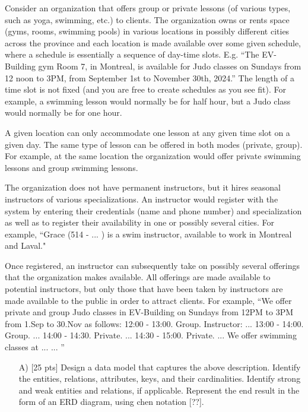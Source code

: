 \documentclass[12pt]{article}
\begin{document}
\begin{spacing}{1.5}
\begin{enumerate}
                  Consider an organization that offers group or private lessons (of various types, such as yoga, swimming, etc.) to clients. The organization owns or rents space (gyms, rooms, swimming pools) in various locations in possibly different cities across the province and each location is made available over some given schedule, where a schedule is essentially a sequence of day-time slots. E.g. “The EV-Building gym Room 7, in Montreal, is available for Judo classes on Sundays from 12 noon to 3PM, from September 1st to November 30th, 2024.” The length of a time slot is not fixed (and you are free to create schedules as you see fit). For example, a swimming lesson would normally be for half hour, but a Judo class would normally be for one hour.

                  A given location can only accommodate one lesson at any given time slot on a given day. The same type of lesson can be offered in both modes (private, group). For example, at the same location the organization would offer private swimming lessons and group swimming lessons.

                  The organization does not have permanent instructors, but it hires seasonal instructors of various specializations. An instructor would register with the system by entering their credentials (name and phone number) and specialization as well as to register their availability in one or possibly several cities. For example, “Grace (514 - ... ) is a swim instructor, available to work in Montreal and Laval."

                  Once registered, an instructor can subsequently take on possibly several offerings that the organization makes available. All offerings are made available to potential instructors, but only those that have been taken by instructors are made available to the public in order to attract clients. For example, “We offer private and group Judo classes in EV-Building on Sundays from 12PM to 3PM from 1.Sep to 30.Nov as follows: 12:00 - 13:00. Group. Instructor: ... 13:00 - 14:00. Group. ... 14:00 - 14:30. Private. ... 14:30 - 15:00. Private. ... We offer swimming classes at ... ... ”

                  \begin{enumerate}
                        \item[A)] [25 pts] Design a data model that captures the above description. Identify the entities, relations, attributes, keys, and their cardinalities. Identify strong and weak entities and relations, if applicable. Represent the end result in the form of an ERD diagram, using chen notation [??].


\end{enumerate}
\end{enumerate}
\end{spacing}
\end{document}
